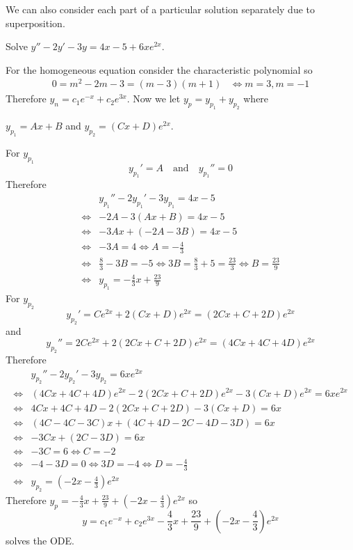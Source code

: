 \documentclass[notes]{subfiles}
\begin{document}
We can also consider each part of a particular solution separately due to superposition.

\begin{exercise}
    Solve $y'' - 2y' - 3y = 4x - 5 + 6xe^{2x}$.
\end{exercise}
\begin{solution}
    For the homogeneous equation consider the characteristic polynomial so
    \begin{align*}
        0 = m^2 - 2m - 3 = (m - 3)(m + 1)
        &\iff m = 3, m = -1
    \end{align*}
    Therefore $y_n = c_1e^{-x} + c_2e^{3x}$. Now we let $y_p = y_{p_1} + y_{p_2}$ where
    
    $y_{p_1} = Ax + B$ and $y_{p_2} = (Cx + D)e^{2x}$.

    For $y_{p_1}$
    \[
        y_{p_1}' = A \quad \text{and} \quad y_{p_1}'' = 0
    \]
    Therefore
    \begin{align*}
        &y_{p_1}'' - 2y_{p_1}' - 3y_{p_1} = 4x - 5 \\
        \iff& -2A - 3(Ax + B) = 4x - 5 \\
        \iff& -3Ax + (-2A - 3B) = 4x - 5 \\
        \iff& -3A = 4 \iff A = -\frac{4}{3} \\
        \iff& \frac{8}{3} - 3B = -5 \iff 3B = \frac{8}{3} + 5 = \frac{23}{3} \iff B = \frac{23}{9} \\
        \iff& y_{p_1} = -\frac{4}{3}x + \frac{23}{9}
    \end{align*}
    For $y_{p_2}$
    \[
        y_{p_2}' = Ce^{2x} + 2(Cx + D)e^{2x} = (2Cx + C + 2D)e^{2x}
    \]
    and
    \[
        y_{p_2}'' = 2Ce^{2x} + 2(2Cx + C + 2D)e^{2x} = (4Cx + 4C + 4D)e^{2x}
    \]
    Therefore
    \begin{align*}
        &y_{p_2}'' - 2y_{p_2}' - 3y_{p_2} = 6xe^{2x} \\
        \iff& (4Cx + 4C + 4D)e^{2x} - 2(2Cx + C + 2D)e^{2x} - 3(Cx + D)e^{2x} = 6xe^{2x} \\
        \iff& 4Cx + 4C + 4D - 2(2Cx + C + 2D) - 3(Cx + D) = 6x \\
        \iff& (4C - 4C - 3C)x + (4C + 4D - 2C - 4D - 3D) = 6x \\
        \iff& -3Cx + (2C - 3D) = 6x \\
        \iff& -3C = 6 \iff C = -2 \\
        \iff& -4 - 3D = 0 \iff 3D = -4 \iff D = -\frac{4}{3} \\
        \iff& y_{p_2} = \left( -2x - \frac{4}{3} \right)e^{2x}
    \end{align*}
    Therefore $y_p = -\frac{4}{3}x + \frac{23}{9} + \left( -2x - \frac{4}{3} \right)e^{2x}$ so
    \[
        y = c_1e^{-x} + c_2e^{3x} - \frac{4}{3}x + \frac{23}{9} + \left( -2x - \frac{4}{3} \right)e^{2x}
    \]
    solves the ODE.
\end{solution}
\end{document}
